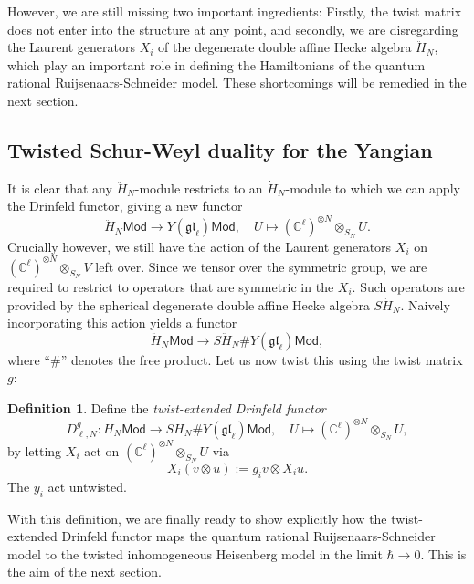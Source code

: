 \documentclass[11pt]{report}
\theoremstyle{definition}
\newtheorem{definition}[theorem]{Definition}
\theoremstyle{remark}
\theoremstyle{remark}
\newcommand{\C}{\mathbb{C}}
\begin{document}
However, we are still missing two important ingredients: Firstly, the twist matrix does not enter into the structure at any point, and secondly, we are disregarding the Laurent generators $X_i$ of the degenerate double affine Hecke algebra $\ddot H_N$, which play an important role in defining the Hamiltonians of the quantum rational Ruijsenaars-Schneider model. These shortcomings will be remedied in the next section.

\subsection{Twisted Schur-Weyl duality for the Yangian}

It is clear that any $\ddot H_N$-module restricts to an $\dot H_N$-module to which we can apply the Drinfeld functor, giving a new functor
\begin{equation*}
\ddot H_N\mathsf{Mod} \to Y(\mathfrak{gl}_\ell)\mathsf{Mod}, \quad U \mapsto (\C^\ell)^{\otimes N} \otimes_{S_N} U.
\end{equation*}
Crucially however, we still have the action of the Laurent generators $X_i$ on $(\C^\ell)^{\otimes N} \otimes_{S_N} V$ left over. Since we tensor over the symmetric group, we are required to restrict to operators that are symmetric in the $X_i$. Such operators are provided by the spherical degenerate double affine Hecke algebra $S\ddot H_N$. Naively incorporating this action yields a functor
\begin{equation*}
\ddot H_N\mathsf{Mod} \to S\ddot H_N \# Y(\mathfrak{gl}_\ell)\mathsf{Mod},
\end{equation*}
where “$\#$” denotes the free product. Let us now twist this using the twist matrix $g$:

\begin{definition}
Define the \emph{twist-extended Drinfeld functor}
\begin{equation*}
D_{\ell,N}^g: \ddot H_N\mathsf{Mod} \to S\ddot H_N \# Y(\mathfrak{gl}_\ell)\mathsf{Mod}, \quad U \mapsto (\C^\ell)^{\otimes N} \otimes_{S_N} U,
\end{equation*}
by letting $X_i$ act on $(\C^\ell)^{\otimes N} \otimes_{S_N} U$ via
\begin{equation*}
X_i(v \otimes u) := g_i v \otimes X_i u.
\end{equation*}
The $y_i$ act untwisted.
\end{definition}

With this definition, we are finally ready to show explicitly how the twist-extended Drinfeld functor maps the quantum rational Ruijsenaars-Schneider model to the twisted inhomogeneous Heisenberg model in the limit $\hbar \to 0$. This is the aim of the next section.
\end{document}

